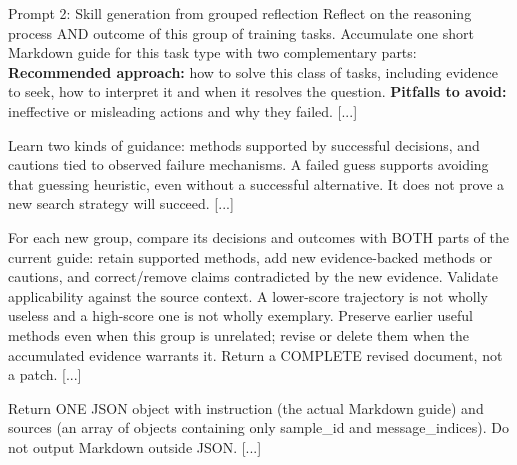 \begin{AppendixPrompt}{Prompt 2: Skill generation from grouped reflection}
Reflect on the reasoning process AND outcome of this group of training tasks. Accumulate one short Markdown guide for this task type with two complementary parts: \textbf{Recommended approach:} how to solve this class of tasks, including evidence to seek, how to interpret it and when it resolves the question. \textbf{Pitfalls to avoid:} ineffective or misleading actions and why they failed. [...]

Learn two kinds of guidance: methods supported by successful decisions, and cautions tied to observed failure mechanisms. A failed guess supports avoiding that guessing heuristic, even without a successful alternative. It does not prove a new search strategy will succeed. [...]

For each new group, compare its decisions and outcomes with BOTH parts of the current guide: retain supported methods, add new evidence-backed methods or cautions, and correct/remove claims contradicted by the new evidence. Validate applicability against the source context. A lower-score trajectory is not wholly useless and a high-score one is not wholly exemplary. Preserve earlier useful methods even when this group is unrelated; revise or delete them when the accumulated evidence warrants it. Return a COMPLETE revised document, not a patch. [...]

Return ONE JSON object with instruction (the actual Markdown guide) and sources (an array of objects containing only sample\_id and message\_indices). Do not output Markdown outside JSON. [...]
\end{AppendixPrompt}

